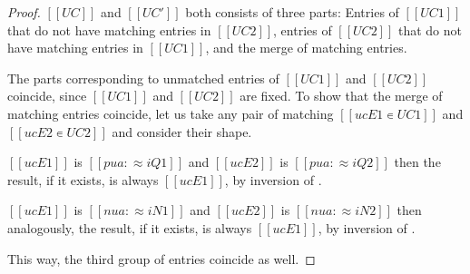 \obsUnifMergeDet*
\begin{proof}
    $[[UC]]$ and $[[UC']]$ both consists of three parts: 
    Entries of $[[UC1]]$ that do not have matching entries in $[[UC2]]$,
    entries of $[[UC2]]$ that do not have matching entries in $[[UC1]]$,
    and the merge of matching entries.

    The parts corresponding to unmatched entries of $[[UC1]]$ and $[[UC2]]$ coincide, 
    since $[[UC1]]$ and $[[UC2]]$ are fixed.
    To show that the merge of matching entries coincide,
    let us take any pair of matching $[[ucE1 ∊ UC1]]$ and $[[ucE2 ∊ UC2]]$
    and consider their shape.
    \begin{caseof}
        \item $[[ucE1]]$ is $[[pua :≈ iQ1]]$ and $[[ucE2]]$ is $[[pua :≈ iQ2]]$
            then the result, if it exists, is always $[[ucE1]]$,
            by inversion of .
        \item $[[ucE1]]$ is $[[nua :≈ iN1]]$ and $[[ucE2]]$ is $[[nua :≈ iN2]]$
            then analogously, the result, if it exists, is always $[[ucE1]]$,
            by inversion of .
    \end{caseof}
    This way, the third group of entries coincide as well.
\end{proof}


